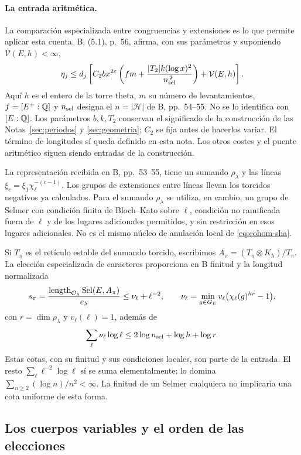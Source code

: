 \paragraph{La entrada aritmética.}
La comparación especializada entre congruencias y extensiones
es lo que permite aplicar esta cuenta.
B, (5.1), p.~56, afirma, con sus parámetros y suponiendo
$\mathcal V(E,h)<\infty$,
\begin{equation}
 \eta_j\le d_j\left[
 C_2b x^{2\varepsilon}
 \left(fm+\frac{|T_2|k(\log x)^2}{n_{\rm sel}^{\,2}}\right)
 +\mathcal V(E,h)\right].
 \label{eq:cohom-entrada-indice}
\end{equation}
Aquí $h$ es el entero de la torre theta, $m$ su número de
levantamientos, $f=[E^+:\mathbb{Q}]$ y $n_{\rm sel}$ designa el
$n=|\mathcal H|$ de B, pp.~54--55.
No se lo identifica con $[E:\mathbb{Q}]$.
Los parámetros $b,k,T_2$ conservan el significado de la
construcción de las Notas~\ref{sec:periodos} y
\ref{sec:geometria}; $C_2$ se fija antes de hacerlos variar.
El término de longitudes sí queda definido en esta nota.
Los otros costes y el puente aritmético siguen siendo
entradas de la construcción.

La representación recibida en B, pp.~53--55, tiene un
sumando $\rho_\lambda$ y las líneas
$\xi_c=\xi_1\chi_\ell^{-(c-1)}$.
Los grupos de extensiones entre líneas llevan los torcidos
negativos ya calculados. Para el sumando $\rho_\lambda$
se utiliza, en cambio, un grupo de Selmer con condición
finita de Bloch--Kato sobre $\ell$, condición no ramificada
fuera de $\ell$ y de los lugares adicionales permitidos,
y sin restricción en esos lugares adicionales.
No es el mismo núcleo de anulación local de
\eqref{eq:cohom-sha}.

Si $T_\pi$ es el retículo estable del sumando torcido,
escribimos $A_\pi=(T_\pi\otimes K_\lambda)/T_\pi$.
La elección especializada de caracteres proporciona en B
finitud y la longitud normalizada
\[
 s_\pi=
 \frac{\operatorname{length}_{\mathcal O_\lambda}
          \operatorname{Sel}(E,A_\pi)}{e_\lambda}
 \le\nu_\ell+\ell^{-2},\qquad
 \nu_\ell=\min_{g\in G_E}
      v_\ell\bigl(\chi_\ell(g)^{hr}-1\bigr),
\]
con $r=\dim\rho_\lambda$ y $v_\ell(\ell)=1$, además de
\[
 \sum_\ell\nu_\ell\log\ell
 \le2\log n_{\rm sel}+\log h+\log r.
\]
Estas cotas, con su finitud y sus condiciones locales, son
parte de la entrada.
El resto $\sum_\ell\ell^{-2}\log\ell$ sí se suma
elementalmente: lo domina
$\sum_{n\ge2}(\log n)/n^2<\infty$.
La finitud de un Selmer cualquiera no implicaría una cota
uniforme de esta forma.

\subsection{Los cuerpos variables y el orden de las elecciones}

